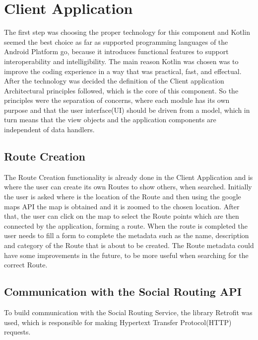 \documentclass{article}
\begin{document}
    \section{Client Application}
        The first step was choosing the proper technology\cite{technologiesclientdocs} for this component and Kotlin \cite{kotlinwebsite} seemed the best choice as far as supported programming languages 
        of the Android Platform go, because it introduces functional features to support interoperability and intelligibility. The main reason Kotlin was chosen was to improve the coding experience in a way that was practical, fast, and effectual.
        After the technology was decided the definition of the Client application\cite{clientapplicationdocs} Architectural principles followed, which is the core of this component. 
        So the principles were the separation of concerns, where each module has its own purpose and that the user interface(UI) 
        should be driven from a model, which in turn means that the view objects and the application components are independent of data handlers.
        
        
        \subsection*{Route Creation}
            The Route Creation functionality is already done in the Client Application and is where the user can create its own Routes to show others, when searched. 
            Initially the user is asked where is the location of the Route and then using the google maps API the map is obtained and it is zoomed to the chosen location. 
            After that, the user can click on the map to select the Route points which are then connected by the application, forming a route. When the route is completed  
            the user needs to fill a form to complete the metadata such as the name, description and category of the Route that is about to be created. 
            The Route metadata could have some improvements in the future, to be more useful when searching for the correct Route.
    
        \subsection*{Communication with the Social Routing API}
            To build communication with the Social Routing Service\cite{communicationwithexternalapis}, the library Retrofit\cite{retrofit} was used, which is responsible for making Hypertext Transfer Protocol(HTTP) \cite{httponlinedocs} requests.\par 
            \newpage
\end{document}

